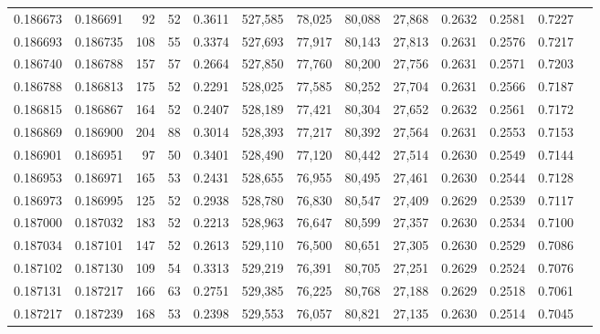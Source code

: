 \begin{tabular}{rrrrrrrrrrrrr}
0.186673 & 0.186691 &    92 &  52 &                                     0.3611 & 527,585 &  78,025 &  80,088 &  27,868 & 0.2632 & 0.2581 & 0.7227 \\
0.186693 & 0.186735 &   108 &  55 &                                     0.3374 & 527,693 &  77,917 &  80,143 &  27,813 & 0.2631 & 0.2576 & 0.7217 \\
0.186740 & 0.186788 &   157 &  57 &                                     0.2664 & 527,850 &  77,760 &  80,200 &  27,756 & 0.2631 & 0.2571 & 0.7203 \\
0.186788 & 0.186813 &   175 &  52 &                                     0.2291 & 528,025 &  77,585 &  80,252 &  27,704 & 0.2631 & 0.2566 & 0.7187 \\
0.186815 & 0.186867 &   164 &  52 &                                     0.2407 & 528,189 &  77,421 &  80,304 &  27,652 & 0.2632 & 0.2561 & 0.7172 \\
0.186869 & 0.186900 &   204 &  88 &                                     0.3014 & 528,393 &  77,217 &  80,392 &  27,564 & 0.2631 & 0.2553 & 0.7153 \\
0.186901 & 0.186951 &    97 &  50 &                                     0.3401 & 528,490 &  77,120 &  80,442 &  27,514 & 0.2630 & 0.2549 & 0.7144 \\
0.186953 & 0.186971 &   165 &  53 &                                     0.2431 & 528,655 &  76,955 &  80,495 &  27,461 & 0.2630 & 0.2544 & 0.7128 \\
0.186973 & 0.186995 &   125 &  52 &                                     0.2938 & 528,780 &  76,830 &  80,547 &  27,409 & 0.2629 & 0.2539 & 0.7117 \\
0.187000 & 0.187032 &   183 &  52 &                                     0.2213 & 528,963 &  76,647 &  80,599 &  27,357 & 0.2630 & 0.2534 & 0.7100 \\
0.187034 & 0.187101 &   147 &  52 &                                     0.2613 & 529,110 &  76,500 &  80,651 &  27,305 & 0.2630 & 0.2529 & 0.7086 \\
0.187102 & 0.187130 &   109 &  54 &                                     0.3313 & 529,219 &  76,391 &  80,705 &  27,251 & 0.2629 & 0.2524 & 0.7076 \\
0.187131 & 0.187217 &   166 &  63 &                                     0.2751 & 529,385 &  76,225 &  80,768 &  27,188 & 0.2629 & 0.2518 & 0.7061 \\
0.187217 & 0.187239 &   168 &  53 &                                     0.2398 & 529,553 &  76,057 &  80,821 &  27,135 & 0.2630 & 0.2514 & 0.7045 \\

\end{tabular}
